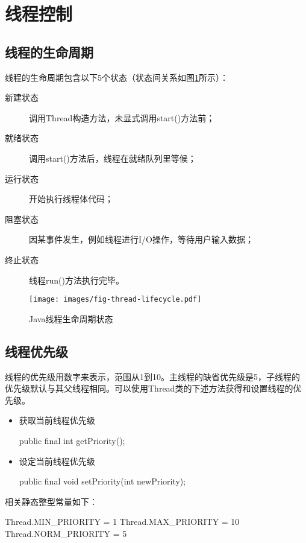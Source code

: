 \section{线程控制}

\subsection{线程的生命周期}

线程的生命周期包含以下5个状态（状态间关系如图\ref{fig:thread-lifecycle}所示）：

\begin{description}
\item[新建状态] 调用Thread构造方法，未显式调用start()方法前；
\item[就绪状态] 调用start()方法后，线程在就绪队列里等候；
\item[运行状态] 开始执行线程体代码；
\item[阻塞状态] 因某事件发生，例如线程进行I/O操作，等待用户输入数据；
\item[终止状态] 线程run()方法执行完毕。
\end{description}

\begin{figure}[h]
\centering
\texttt{[image: images/fig-thread-lifecycle.pdf]}
\caption{Java线程生命周期状态}
\label{fig:thread-lifecycle}
\end{figure}

\subsection{线程优先级}

线程的优先级用数字来表示，范围从1到10。主线程的缺省优先级是5，子线程的
优先级默认与其父线程相同。可以使用Thread类的下述方法获得和设置线程的优
先级。

\begin{itemize}
\item 获取当前线程优先级
  \begin{javaCode}
    public final int getPriority();
  \end{javaCode}
\item 设定当前线程优先级
  \begin{javaCode}
    public final void setPriority(int newPriority);
  \end{javaCode}
\end{itemize}

相关静态整型常量如下：

\begin{javaCode}
Thread.MIN_PRIORITY = 1
Thread.MAX_PRIORITY = 10
Thread.NORM_PRIORITY = 5
\end{javaCode}

